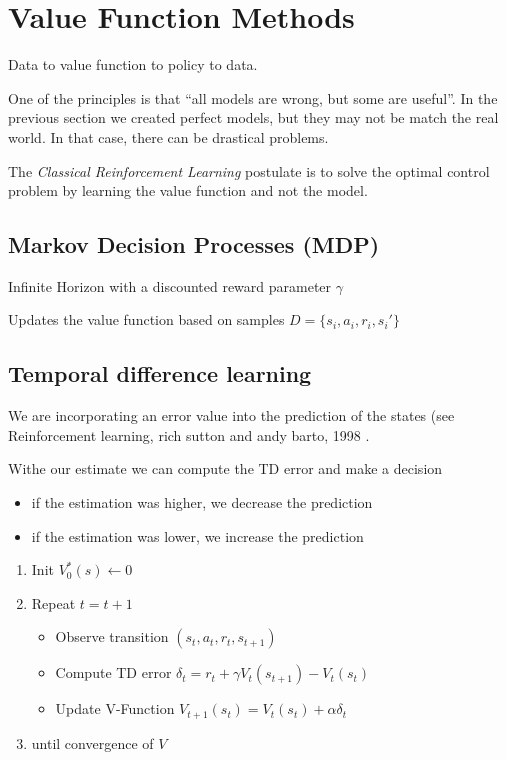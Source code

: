 \section{Value Function Methods}

Data to value function to policy to data.

One of the principles is that ``all models are wrong, but some are useful''. In
the previous section we created perfect models, but they may not be match the
real world. In that case, there can be drastical problems.

The \emph{Classical Reinforcement Learning} postulate is to solve the optimal
control problem by learning the value function and not the model.

\subsection{Markov Decision Processes (MDP)}

Infinite Horizon with a discounted reward parameter $\gamma$

Updates the value function based on samples $D = \{s_i, a_i, r_i, s_i'\}$

\subsection{Temporal difference learning}

We are incorporating an error value into the prediction of the states (see
  Reinforcement learning, rich sutton and andy barto, 1998
  \cite{sutton1998reinforcement}.

Withe our estimate we can compute the TD error and make a decision

\begin{itemize}
  \item if the estimation was higher, we decrease the prediction
  \item if the estimation was lower, we increase the prediction
\end{itemize}

\begin{enumerate}
  \item Init $V_0^*(s) \leftarrow 0$
  \item Repeat $t=t+1$
    \begin{itemize}
      \item Observe transition $(s_t,a_t,r_t,s_{t+1})$
      \item Compute TD error $\delta_t = r_t + \gamma V_t(s_{t+1}) - V_t(s_t)$
      \item Update V-Function $V_{t+1}(s_t) = V_t(s_t) + \alpha\delta_t$
    \end{itemize}
  \item until convergence of $V$
\end{enumerate}


